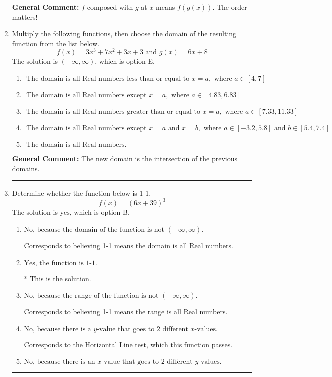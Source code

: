 \documentclass{extbook}[14pt]
\newcommand{\litem}[1]{\item #1

\rule{\textwidth}{0.4pt}}
\begin{document}
\begin{enumerate}
{\textbf{General Comment:} $f$ composed with $g$ at $x$ means $f(g(x))$. The order matters!
}
\litem{
Multiply the following functions, then choose the domain of the resulting function from the list below.
\[ f(x) = 3x^{3} +7 x^{2} +3 x + 3 \text{ and } g(x) = 6x + 8 \]The solution is \( (-\infty, \infty) \), which is option E.\begin{enumerate}[label=\Alph*.]
\item \( \text{ The domain is all Real numbers less than or equal to } x = a, \text{ where } a \in [4, 7] \)


\item \( \text{ The domain is all Real numbers except } x = a, \text{ where } a \in [4.83, 6.83] \)


\item \( \text{ The domain is all Real numbers greater than or equal to } x = a, \text{ where } a \in [7.33, 11.33] \)


\item \( \text{ The domain is all Real numbers except } x = a \text{ and } x = b, \text{ where } a \in [-3.2, 5.8] \text{ and } b \in [5.4, 7.4] \)


\item \( \text{ The domain is all Real numbers. } \)


\end{enumerate}

\textbf{General Comment:} The new domain is the intersection of the previous domains.
}
\litem{
Determine whether the function below is 1-1.
\[ f(x) = (6 x + 39)^3 \]The solution is \( \text{yes} \), which is option B.\begin{enumerate}[label=\Alph*.]
\item \( \text{No, because the domain of the function is not $(-\infty, \infty)$.} \)

Corresponds to believing 1-1 means the domain is all Real numbers.
\item \( \text{Yes, the function is 1-1.} \)

* This is the solution.
\item \( \text{No, because the range of the function is not $(-\infty, \infty)$.} \)

Corresponds to believing 1-1 means the range is all Real numbers.
\item \( \text{No, because there is a $y$-value that goes to 2 different $x$-values.} \)

Corresponds to the Horizontal Line test, which this function passes.
\item \( \text{No, because there is an $x$-value that goes to 2 different $y$-values.} \)


\end{enumerate}}
\end{enumerate}
\end{document}
